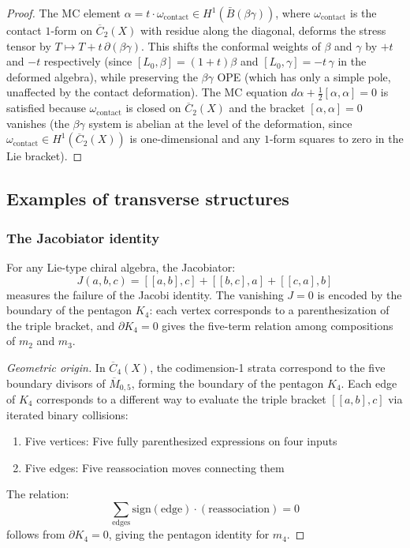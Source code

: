 \begin{proof}
The MC element $\alpha = t \cdot \omega_{\mathrm{contact}} \in
H^1(\bar{B}(\beta\gamma))$, where $\omega_{\mathrm{contact}}$ is the
contact $1$-form on $\overline{C}_2(X)$ with residue along the diagonal,
deforms the stress tensor by
$T \mapsto T + t\,\partial(\beta\gamma)$.  This shifts the conformal
weights of $\beta$ and $\gamma$ by $+t$ and $-t$ respectively (since
$[L_0, \beta] = (1{+}t)\beta$ and $[L_0, \gamma] = -t\,\gamma$ in
the deformed algebra), while preserving the $\beta\gamma$ OPE (which
has only a simple pole, unaffected by the contact deformation).
The MC equation $d\alpha + \frac{1}{2}[\alpha,\alpha] = 0$ is
satisfied because $\omega_{\mathrm{contact}}$ is closed on
$\overline{C}_2(X)$ and the bracket $[\alpha, \alpha] = 0$
vanishes (the $\beta\gamma$ system is abelian at the level of
the deformation, since $\omega_{\mathrm{contact}} \in
H^1(\overline{C}_2(X))$ is one-dimensional and any $1$-form
squares to zero in the Lie bracket).
\end{proof}


\subsection{Examples of transverse structures}

\subsubsection{The Jacobiator identity}

\begin{theorem}\label{thm:jacobiator-lie-type}
For any Lie-type chiral algebra, the Jacobiator:
\[J(a,b,c) = [[a,b],c] + [[b,c],a] + [[c,a],b]\]
measures the failure of the Jacobi identity. The vanishing $J = 0$ is encoded by the boundary of the pentagon $K_4$: each vertex corresponds to a parenthesization of the triple bracket, and $\partial K_4 = 0$ gives the five-term relation among compositions of $m_2$ and $m_3$.
\end{theorem}

\begin{proof}[Geometric origin]
In $\overline{C}_4(X)$, the codimension-1 strata correspond to the five boundary divisors of $\overline{M}_{0,5}$, forming the boundary of the pentagon $K_4$. Each edge of $K_4$ corresponds to a different way to evaluate the triple bracket $[[a,b],c]$ via iterated binary collisions:
\begin{enumerate}
\item Five vertices: Five fully parenthesized expressions on four inputs
\item Five edges: Five reassociation moves connecting them
\end{enumerate}

The relation:
\[\sum_{\text{edges}} \text{sign}(\text{edge}) \cdot (\text{reassociation}) = 0\]
follows from $\partial K_4 = 0$, giving the pentagon identity for $m_4$.
\end{proof}

